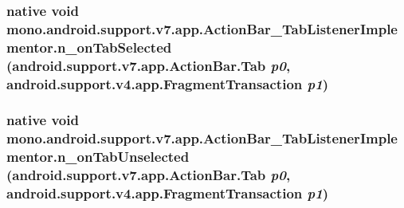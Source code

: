 \hypertarget{classmono_1_1android_1_1support_1_1v7_1_1app_1_1_action_bar___tab_listener_implementor_06aacdc0d14afecfc6fa582fbf0401c8}{
\subsubsection[{n\_\-onTabSelected}]{\setlength{\rightskip}{0pt plus 5cm}native void mono.android.support.v7.app.ActionBar\_\-TabListenerImplementor.n\_\-onTabSelected (android.support.v7.app.ActionBar.Tab {\em p0}, \/  android.support.v4.app.FragmentTransaction {\em p1})}}
\label{classmono_1_1android_1_1support_1_1v7_1_1app_1_1_action_bar___tab_listener_implementor_06aacdc0d14afecfc6fa582fbf0401c8}


\hypertarget{classmono_1_1android_1_1support_1_1v7_1_1app_1_1_action_bar___tab_listener_implementor_556a1159676001cd5eeea2d744cd3ad6}{
\subsubsection[{n\_\-onTabUnselected}]{\setlength{\rightskip}{0pt plus 5cm}native void mono.android.support.v7.app.ActionBar\_\-TabListenerImplementor.n\_\-onTabUnselected (android.support.v7.app.ActionBar.Tab {\em p0}, \/  android.support.v4.app.FragmentTransaction {\em p1})}}
\label{classmono_1_1android_1_1support_1_1v7_1_1app_1_1_action_bar___tab_listener_implementor_556a1159676001cd5eeea2d744cd3ad6}


